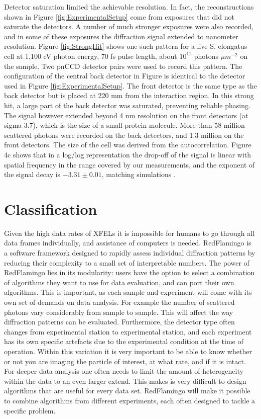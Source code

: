Detector saturation limited the achievable resolution.  In fact, the reconstructions shown in Figure \ref{fig:ExperimentalSetup} come from exposures that did not saturate the detectors. A number of much stronger exposures were also recorded, and in some of these exposures the diffraction signal extended to nanometer resolution. Figure \ref{fig:StrongHit} shows one such pattern for a live S. elongatus cell at 1,100 eV photon energy, 70 fs pulse length, about $10^11$ photons $\mu m^{-2}$ on the sample. Two pnCCD detector pairs were used to record this pattern. The configuration of the central back detector in Figure  is identical to the detector used in Figure \ref{fig:ExperimentalSetup}. The front detector is the same type as the back detector but is placed at 220 mm from the interaction region. In this strong hit, a large part of the back detector was saturated, preventing reliable phasing. The signal however extended beyond 4 nm resolution on the front detectors (at sigma 3.7), which is the size of a small protein molecule. More than 58 million scattered photons were recorded on the back detectors, and 1.3 million on the front detectors. The size of the cell was derived from the autocorrelation. Figure 4c shows that in a log/log representation the drop-off of the signal is linear with spatial frequency in the range covered by our measurements, and the exponent of the signal decay is $-3.31\pm0.01$, matching simulations \cite{Huang2009}.



\section{Classification}

Given the high data rates of XFELs it is impossible for humans to go through all data frames individually, and assistance of computers is needed.
RedFlamingo is a software framework designed to rapidly assess individual diffraction patterns by reducing their complexity to a small set of interpretable numbers. The power of RedFlamingo lies in its modularity: users have the option to select a combination of algorithms they want to use for data evaluation, and can port their own algorithms. This is important, as each sample and experiment will come with its own set of demands on data analysis. For example the number of scattered photons vary considerably from sample to sample. This will affect the way diffraction patterns can be evaluated. Furthermore, the detector type often changes from experimental station to experimental station, and each experiment has its own specific artefacts due to the experimental condition at the time of operation. Within this variation it is very important to be able to know whether or not you are imaging the particle of interest, at what rate, and if it is intact. For deeper data analysis one often needs to limit the amount of heterogeneity within the data to an even larger extend. This makes is very difficult to design algorithms that are useful for every data set. RedFlamingo will make it possible to combine algorithms from different experiments, each often designed to tackle a specific problem. 

